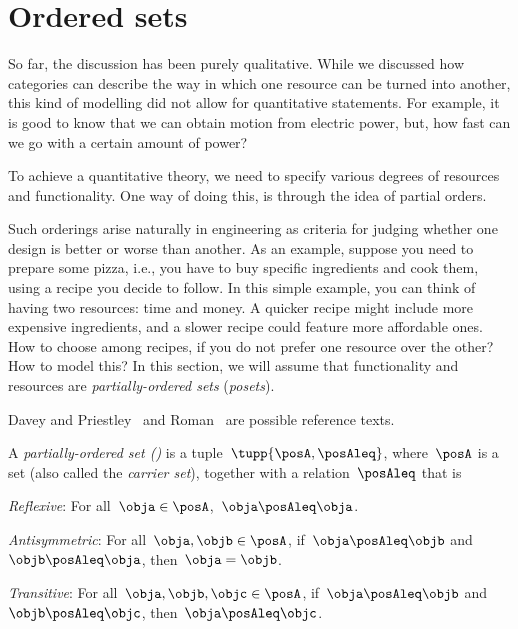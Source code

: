 

\section{Ordered sets} \label{sec:tradeoffs-ordered-sets}


So far, the discussion has been purely qualitative. While we discussed how
categories can describe the way in which one resource can be turned into another,
this kind of modelling did not allow for quantitative statements. For example, it
is good to know that we can obtain motion from electric power, but, how fast can
we go with a certain amount of power?

To achieve a quantitative theory, we need to specify various degrees of resources and functionality.
One way of doing this, is through the idea of partial orders.


Such orderings arise naturally in engineering as criteria for judging whether one design is better or worse than another. As an example, suppose you need to prepare some pizza, i.e., you have to buy specific ingredients and cook them, using a recipe you decide to follow. In this simple example, you can think of having two resources: time and money. A quicker recipe might include more expensive ingredients, and a slower recipe could feature more affordable ones. How to choose among recipes, if you do not prefer one resource over the other? How to model this? In this section, we will assume that functionality and resources
are \emph{partially-ordered sets} (\emph{posets}).

Davey and Priestley~\cite{davey02}
and Roman~\cite{roman08} are possible reference texts.



\begin{definition}
  \label{def:poset}
  A \emph{partially-ordered set ()} is a tuple~$\tupp{\posA,\posAleq}$,
  where~$\posA$ is a set (also called the \emph{carrier set}), together with a
  relation~$\posAleq$   that is
  \begin{compactenum}
    \item \emph{Reflexive}: For all~$\obja\in \posA$,~$\obja \posAleq \obja$.
    \item \emph{Antisymmetric}: For all~$\obja,\objb\in \posA$, if~$\obja\posAleq \objb$ and~$\objb\posAleq \obja$, then~$\obja=\objb$.
    \item \emph{Transitive}: For all~$\obja,\objb,\objc\in \posA$, if~$\obja\posAleq \objb$ and~$\objb\posAleq \objc$, then~$\obja\posAleq \objc$.
  \end{compactenum}
\end{definition}

